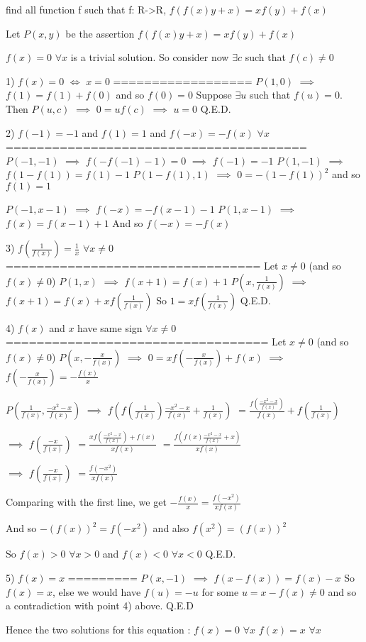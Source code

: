 \begin{solution}
	\begin{tcolorbox}find all function f such that f: R->R, $ f(f(x)y+x)=xf(y)+f(x)$\end{tcolorbox}

Let $ P(x,y)$ be the assertion $ f(f(x)y+x)=xf(y)+f(x)$

$ f(x)=0$ $ \forall x$ is a trivial solution. So consider now $ \exists c$ such that $ f(c)\neq 0$

1) $ f(x)=0$ $ \iff$ $ x=0$
==================
$ P(1,0)$ $ \implies$ $ f(1)=f(1)+f(0)$ and so $ f(0)=0$
Suppose $ \exists u$ such that $ f(u)=0$. Then $ P(u,c)$ $ \implies$ $ 0=uf(c)$ $ \implies$ $ u=0$
Q.E.D.

2) $ f(-1)=-1$ and $ f(1)=1$ and $ f(-x)=-f(x)$ $ \forall x$
=======================================
$ P(-1,-1)$ $ \implies$ $ f(-f(-1)-1)=0$ $ \implies$ $ f(-1)=-1$
$ P(1,-1)$ $ \implies$ $ f(1-f(1))=f(1)-1$
$ P(1-f(1),1)$ $ \implies$ $ 0=-(1-f(1))^2$ and so $ f(1)=1$

$ P(-1,x-1)$ $ \implies$ $ f(-x)=-f(x-1)-1$
$ P(1,x-1)$ $ \implies$ $ f(x)=f(x-1)+1$
And so $ f(-x)=-f(x)$

3) $ f(\frac{1}{f(x)})=\frac 1x$ $ \forall x\neq 0$
=================================
Let $ x\neq 0$ (and so $ f(x)\neq 0$)
$ P(1,x)$ $ \implies$ $ f(x+1)=f(x)+1$
$ P(x,\frac{1}{f(x)})$ $ \implies$ $ f(x+1)=f(x)+xf(\frac{1}{f(x)})$
So $ 1=xf(\frac{1}{f(x)})$
Q.E.D.

4) $ f(x)$ and $ x$ have same sign $ \forall x\neq 0$
==================================
Let $ x\neq 0$ (and so $ f(x)\neq 0$)
$ P(x,-\frac{x}{f(x)})$ $ \implies$ $ 0=xf(-\frac{x}{f(x)})+f(x)$ $ \implies$ $ f(-\frac{x}{f(x)})=-\frac{f(x)}{x}$

$ P(\frac{1}{f(x)},\frac{-x^2-x}{f(x)})$ $ \implies$ $ f(f(\frac{1}{f(x)})\frac{-x^2-x}{f(x)}+\frac{1}{f(x)})$ $ =\frac{f(\frac{-x^2-x}{f(x)})}{f(x)}+f(\frac{1}{f(x)})$

$ \implies$ $ f(\frac{-x}{f(x)})$ $ =\frac{xf(\frac{-x^2-x}{f(x)})+f(x)}{xf(x)}$ $ =\frac{f(f(x)\frac{-x^2-x}{f(x)}+x)}{xf(x)}$

$ \implies$ $ f(\frac{-x}{f(x)})$ $ =\frac{f(-x^2)}{xf(x)}$

Comparing with the first line, we get $ -\frac{f(x)}{x}=\frac{f(-x^2)}{xf(x)}$

And so ${ -(f(x))^2=f(-x^2)}$ and also $ f(x^2)=(f(x))^2$

So $ f(x)>0$ $ \forall x>0$ and $ f(x)<0$ $ \forall x<0$
Q.E.D.

5) $ f(x)=x$
=========
$ P(x,-1)$ $ \implies$ $ f(x-f(x))=f(x)-x$
So $ f(x)=x$, else we would have $ f(u)=-u$ for some $ u=x-f(x)\neq 0$ and so a contradiction with point 4) above.
Q.E.D


Hence the two solutions for this equation :
$ f(x)=0$ $ \forall x$
$ f(x)=x$ $ \forall x$
\end{solution}



